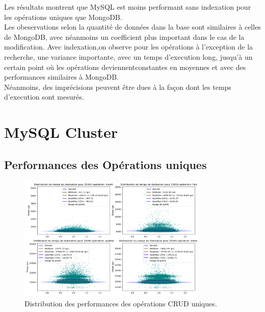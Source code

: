 \documentclass[12pt,a4paper]{report}
\begin{document}
            \begin{card}
                Les résultats montrent que MySQL est moins performant sans indexation pour les opérations uniques que MongoDB. \\
                Les obeservations selon la quantité de données dans la base sont similaires à celles de MongoDB, avec néanmoins un coefficient plus important dans le cas de la modification.
                Avec indexation,on observe pour les opérations à l'exception de la recherche, une variance importante, avec un temps d'execution long, jusqu'à un certain point où les opérations deviennentconstantes en moyennes et avec des performances similaires à MongoDB. \\
                Néanmoins, des imprécisions peuvent être dues à la façon dont les temps d'execution sont mesurés.
            \end{card}

\section{MySQL Cluster}
            
    \subsection{Performances des Opérations uniques}

        \begin{figure}[H]
            \centering
            \includegraphics[width=0.8\textwidth]{../plots/MySQL/sharding/global_test_one.png}
            \caption{Distribution des performances des opérations CRUD uniques.}
            \label{fig:mysql_cluster_global_one}
        \end{figure}
\end{document}
